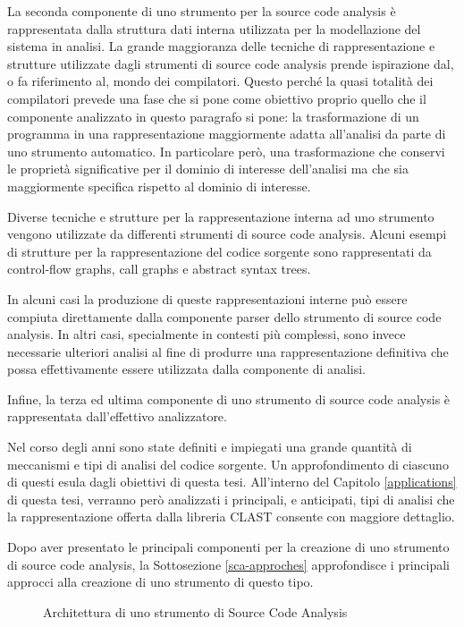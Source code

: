 La seconda componente di uno strumento per la source code analysis è
rappresentata dalla struttura dati interna utilizzata per la modellazione del
sistema in analisi. La grande maggioranza delle tecniche di rappresentazione e
strutture utilizzate dagli strumenti di source code analysis prende ispirazione
dal, o fa riferimento al, mondo dei compilatori. Questo perché la quasi totalità
dei compilatori prevede una fase che si pone come obiettivo proprio quello che
il componente analizzato in questo paragrafo si pone: la trasformazione di un
programma in una rappresentazione maggiormente adatta all’analisi da parte di
uno strumento automatico. In particolare però, una trasformazione che conservi
le proprietà significative per il dominio di interesse dell'analisi ma che sia
maggiormente specifica rispetto al dominio di interesse.

Diverse tecniche e strutture per la rappresentazione interna ad uno strumento
vengono utilizzate da differenti strumenti di source code analysis. Alcuni
esempi di strutture per la rappresentazione del codice sorgente sono
rappresentati da control-flow graphs, call graphs e abstract syntax trees.

In alcuni casi la produzione di queste rappresentazioni interne può essere
compiuta direttamente dalla componente parser dello strumento di source code
analysis. In altri casi, specialmente in contesti più complessi, sono invece
necessarie ulteriori analisi al fine di produrre una rappresentazione definitiva
che possa effettivamente essere utilizzata dalla componente di analisi.

Infine, la terza ed ultima componente di uno strumento di source code analysis è
rappresentata dall’effettivo analizzatore.

Nel corso degli anni sono state definiti e impiegati una grande quantità di
meccanismi e tipi di analisi del codice sorgente. Un approfondimento di ciascuno
di questi esula dagli obiettivi di questa tesi. All’interno del Capitolo
\ref{applications} di questa tesi, verranno però analizzati i principali, e
anticipati, tipi di analisi che la rappresentazione offerta dalla libreria CLAST
consente con maggiore dettaglio.

Dopo aver presentato le principali componenti per la creazione di uno strumento
di source code analysis, la Sottosezione \ref{sca-approches} approfondisce i
principali approcci alla creazione di uno strumento di questo tipo.

\begin{figure}
\caption{Architettura di uno strumento di Source Code Analysis}
\label{fig:sca-tool-architecture}
\end{figure}

